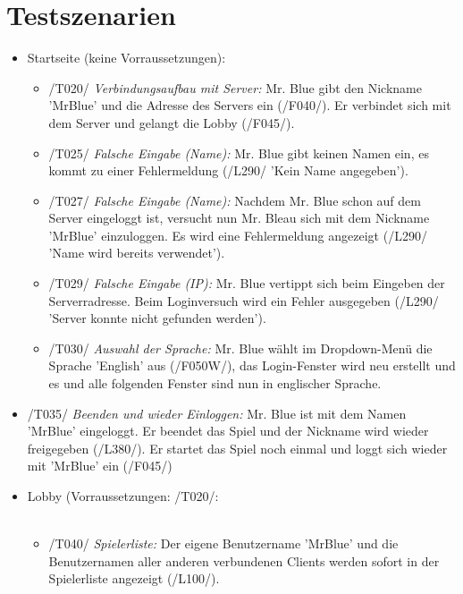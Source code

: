 \documentclass{article}
\begin{document}
\section{Testszenarien}
\begin{itemize}
	\item Startseite (keine Vorraussetzungen): \\
	\begin{itemize}
	
		\item /T020/ \textit{Verbindungsaufbau mit \gls{Server}:} Mr. Blue gibt den Nickname 'MrBlue' und die Adresse des \gls{Server}s ein (/F040/). Er verbindet sich mit dem \gls{Server} und gelangt die \gls{Lobby} (/F045/). 
		
		\item /T025/ \textit{Falsche Eingabe (Name):} Mr. Blue gibt keinen Namen ein, es kommt zu einer Fehlermeldung (/L290/ 'Kein Name angegeben').
		
		\item /T027/ \textit{Falsche Eingabe (Name):} Nachdem Mr. Blue schon auf dem \gls{Server} eingeloggt ist, versucht nun Mr. Bleau sich mit dem Nickname 'MrBlue' einzuloggen. Es wird eine Fehlermeldung angezeigt (/L290/ 'Name wird bereits verwendet').
		
		\item /T029/ \textit{Falsche Eingabe (IP):} Mr. Blue vertippt sich beim Eingeben der \gls{Server}radresse. Beim Loginversuch wird ein Fehler ausgegeben (/L290/ '\gls{Server} konnte nicht gefunden werden').
		
		\item /T030/ \textit{Auswahl der Sprache:} Mr. Blue wählt im Dropdown-Menü die Sprache 'English' aus (/F050W/), das Login-Fenster wird neu erstellt und es und alle folgenden Fenster sind nun in englischer Sprache.
	\end{itemize}
	
		\item /T035/ \textit{Beenden und wieder Einloggen:} Mr. Blue ist mit dem Namen 'MrBlue' eingeloggt. Er beendet das Spiel und der Nickname wird wieder freigegeben (/L380/). Er startet das Spiel noch einmal und loggt sich wieder mit 'MrBlue' ein (/F045/)

	\item \gls{Lobby} (Vorraussetzungen: /T020/: \\ \\
	\begin{itemize}
	
		\item /T040/ \textit{Spielerliste:} Der eigene Benutzername 'MrBlue' und die Benutzernamen aller anderen verbundenen \gls{Client}s werden sofort in der Spielerliste angezeigt (/L100/).
		

\end{itemize}
\end{itemize}
\end{document}
